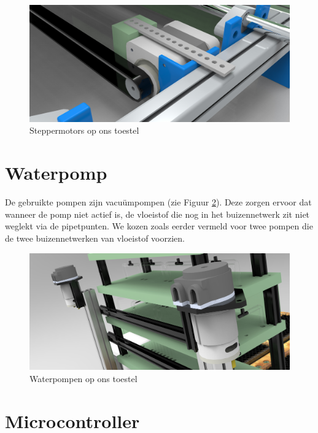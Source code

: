 \documentclass[a4paper,twoside,kulak]{kulakreport} %
\begin{document}
\begin{figure}
	\centering
	\includegraphics[width=1\textwidth]{fotomotor.jpg}
	\caption{Steppermotors op ons toestel}
	\label{fig: steppermotor}
	
\end{figure} 

\section{Waterpomp}

De gebruikte pompen zijn vacuümpompen (zie Figuur \ref{fig: waterpomp}). Deze zorgen ervoor dat wanneer de pomp niet actief is, de vloeistof die nog in het buizennetwerk zit niet weglekt via de pipetpunten. We kozen zoals eerder vermeld voor twee pompen die de twee buizennetwerken van vloeistof voorzien. 

\begin{figure}
	\centering
	\includegraphics[width=1\textwidth]{fotopomp.jpg}
	\caption{Waterpompen op ons toestel}
	\label{fig: waterpomp}
	
\end{figure} 

\section{Microcontroller}
\end{document}
